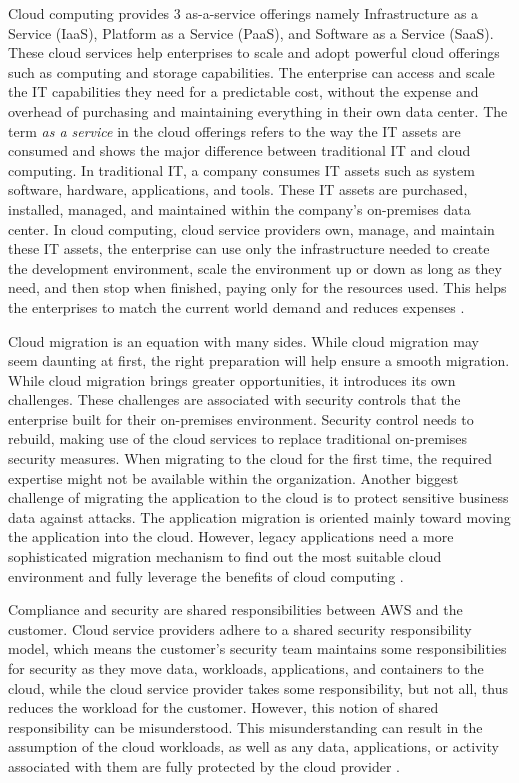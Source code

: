 \par Cloud computing provides 3 as-a-service offerings namely Infrastructure as a Service (IaaS), Platform as a
Service (PaaS), and Software as a Service (SaaS).
These cloud services help enterprises to scale and adopt powerful cloud offerings such as computing and storage capabilities.
The enterprise can access and scale the IT capabilities they need for a predictable cost, without the expense and overhead of purchasing and maintaining everything in their own data center. The term \textit{as a service} in the cloud offerings refers to the way the IT assets are consumed and shows the major difference between traditional IT and cloud computing. In traditional IT, a company consumes IT assets such as system software, hardware, applications, and tools. These IT assets are purchased, installed, managed, and maintained within the company’s on-premises data center. In cloud computing, cloud service providers own, manage, and maintain these IT assets, the enterprise can use only the infrastructure needed to create the development environment, scale the environment up or down as long as they need, and then stop when finished, paying only for the resources used. This helps the enterprises to match the current world demand and reduces expenses \cite{3}.

\par Cloud migration is an equation with many sides.
While cloud migration may seem daunting at first, the right preparation will help ensure a smooth migration.
While cloud migration brings greater opportunities, it introduces its own challenges.
These challenges are associated with security controls that the enterprise built for their on-premises environment.
Security control needs to rebuild, making use of the cloud services to replace traditional on-premises security measures.
When migrating to the cloud for the first time, the required expertise might not be available within the organization.
Another biggest challenge of migrating the application to the cloud is to protect sensitive business data against attacks.
The application migration is oriented mainly toward moving the application into the cloud.
However, legacy applications need a more sophisticated migration mechanism to find out the most suitable cloud environment and fully leverage the benefits of cloud computing \cite{4}.

\par Compliance and security are shared responsibilities
between AWS and the customer. Cloud service providers
adhere to a shared security responsibility model, which means the customer’s security team maintains some responsibilities for security as they move data, workloads, applications, and containers to the cloud, while the cloud service provider takes some responsibility, but not all, thus reduces the workload for the customer. However, this notion of shared responsibility can be misunderstood. This misunderstanding can result in the assumption of the cloud workloads, as well as any data, applications, or activity associated with them are fully protected by the cloud provider \cite{5}.



